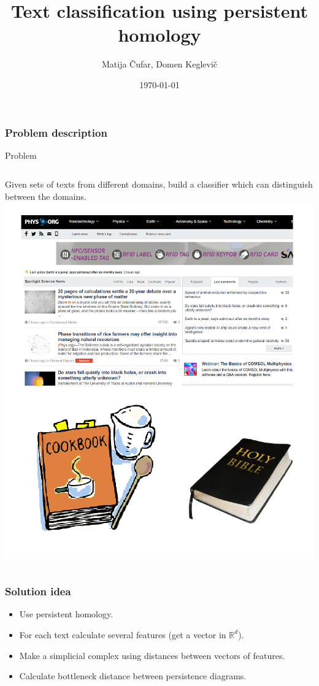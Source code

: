 \documentclass[unknownkeysallowed]{beamer}
\title[Text Analysis]{Text classification using persistent homology} %
\author{Matija Čufar, Domen Keglevič} %
\institute[] %
{
Faculty of Computer and Information Science \\ %
\medskip
}
\date{\today} %
\def\R{\mathbb R}
\begin{document}
\begin{frame}
\titlepage %
\end{frame}

\begin{frame}
\frametitle{Problem description} 
\begin{block}{Problem}
\begin{columns}[c]
	Given sets of texts from different domains, build a classifier which can distinguish between the domains.
	\includegraphics[width=0.9\linewidth]{different_domains}
\end{columns}
\end{block}
\end{frame}

\begin{frame}
\frametitle{Solution idea}
\begin{itemize}
\item Use persistent homology.
\bigskip
\item For each text calculate several features (get a vector in $\R ^d$).
\bigskip
\item Make a simplicial complex using distances between vectors of features.
\bigskip
\item Calculate bottleneck distance between persistence diagrams.
\end{itemize}
\end{frame}
\end{document}
